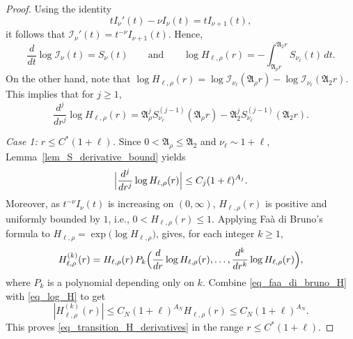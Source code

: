 \documentclass[12pt]{amsart}
\begin{document}
\begin{proof}
Using the identity
\begin{equation*}
    tI_\nu'(t)-\nu I_\nu(t)=tI_{\nu+1}(t),
\end{equation*}
it follows that $\mathcal I_\nu'(t)=t^{-\nu}I_{\nu+1}(t)$. Hence,
\begin{equation*}
    \frac{d}{dt}\log\mathcal I_\nu(t) = S_\nu(t)
    \qquad\text{and}\qquad
    \log H_{\ell,\rho}(r)
    =
    -\int_{\mathfrak A_\rho r}^{\mathfrak A_2 r}S_{\nu_\ell}(t) \, dt.
\end{equation*}
On the other hand, note that $\log H_{\ell,\rho}(r) = \log\mathcal I_{\nu_\ell}(\mathfrak A_\rho r) - \log\mathcal I_{\nu_\ell}(\mathfrak A_2 r)$.
This implies that for $j\ge 1$,
\begin{equation}\label{eq_log_H_derivative_formula}
    \frac{d^j}{dr^j}\log H_{\ell,\rho}(r)
    =
    \mathfrak A_\rho^j S_{\nu_\ell}^{(j-1)}(\mathfrak A_\rho r)
    -
    \mathfrak A_2^j S_{\nu_\ell}^{(j-1)}(\mathfrak A_2 r).
\end{equation}

\textit{Case 1: $r\le C^*(1+\ell)$.} Since $0<\mathfrak A_\rho\le \mathfrak A_2$ and $\nu_\ell\sim 1+\ell$, Lemma~\ref{lem_S_derivative_bound} yields
\begin{equation}\label{eq_log_H}
    \Bigl|
        \frac{d^j}{dr^j}\log H_{\ell,\rho}(r)
    \Bigr|
    \le
    C_j(1+\ell)^{A_j}.
\end{equation}
Moreover, as $t^{-\nu}I_\nu(t)$ is increasing on $(0,\infty)$, $H_{\ell,\rho}(r)$ is positive and uniformly bounded by $1$, i.e., $0<H_{\ell,\rho}(r)\le 1$.
Applying Faà di Bruno's formula to $H_{\ell,\rho}=\exp\bigl(\log H_{\ell,\rho}\bigr)$, gives, for each integer $k\ge 1$,
\begin{equation}\label{eq_faa_di_bruno_H}
    H_{\ell,\rho}^{(k)}(r)
    =
    H_{\ell,\rho}(r)
    \, P_k\Bigl(
        \frac{d}{dr}\log H_{\ell,\rho}(r),
        \dots,
        \frac{d^k}{dr^k}\log H_{\ell,\rho}(r)
    \Bigr),
\end{equation}
where $P_k$ is a polynomial depending only on $k$. Combine \eqref{eq_faa_di_bruno_H} with \eqref{eq_log_H} to get
\begin{equation}\label{eq_H_k}
    |H_{\ell,\rho}^{(k)}(r)|
    \le
    C_N (1+\ell)^{A_N} H_{\ell,\rho}(r)
    \le
    C_N (1+\ell)^{A_N}.
\end{equation}
This proves \eqref{eq_transition_H_derivatives} in the range $r\le C^*(1+\ell)$. 


\end{proof}
\end{document}
